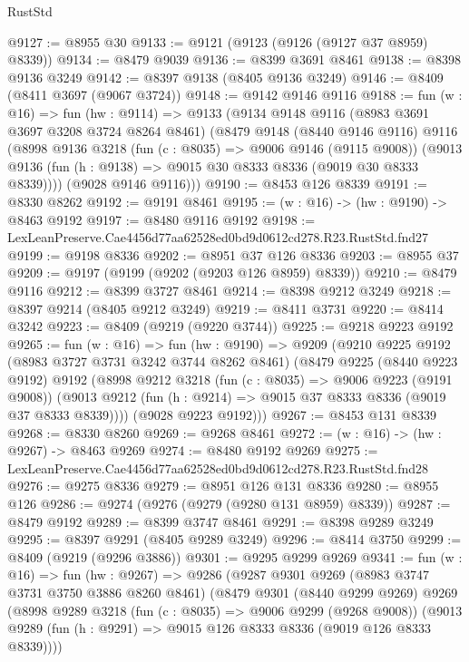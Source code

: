 \begin{lexlean}{RustStd}
\begin{coremodule}
@9127 := @8955 @30
@9133 := @9121 (@9123 (@9126 (@9127 @37 @8959) @8339))
@9134 := @8479 @9039
@9136 := @8399 @3691 @8461
@9138 := @8398 @9136 @3249
@9142 := @8397 @9138 (@8405 @9136 @3249)
@9146 := @8409 (@8411 @3697 (@9067 @3724))
@9148 := @9142 @9146 @9116
@9188 := fun (w : @16) =>
  fun (hw : @9114) =>
  @9133
    (@9134
      @9148
      @9116
      (@8983 @3691 @3697 @3208 @3724 @8264 @8461)
      (@8479
        @9148
        (@8440 @9146 @9116)
        @9116
        (@8998
          @9136
          @3218
          (fun (c : @8035) => @9006 @9146 (@9115 @9008))
          (@9013 @9136 (fun (h : @9138) => @9015 @30 @8333 @8336 (@9019 @30 @8333 @8339))))
        (@9028 @9146 @9116)))
@9190 := @8453 @126 @8339
@9191 := @8330 @8262
@9192 := @9191 @8461
@9195 := (w : @16) -> (hw : @9190) -> @8463 @9192
@9197 := @8480 @9116 @9192
@9198 := LexLeanPreserve.Cae4456d77aa62528ed0bd9d0612cd278.R23.RustStd.fnd27
@9199 := @9198 @8336
@9202 := @8951 @37 @126 @8336
@9203 := @8955 @37
@9209 := @9197 (@9199 (@9202 (@9203 @126 @8959) @8339))
@9210 := @8479 @9116
@9212 := @8399 @3727 @8461
@9214 := @8398 @9212 @3249
@9218 := @8397 @9214 (@8405 @9212 @3249)
@9219 := @8411 @3731
@9220 := @8414 @3242
@9223 := @8409 (@9219 (@9220 @3744))
@9225 := @9218 @9223 @9192
@9265 := fun (w : @16) =>
  fun (hw : @9190) =>
  @9209
    (@9210
      @9225
      @9192
      (@8983 @3727 @3731 @3242 @3744 @8262 @8461)
      (@8479
        @9225
        (@8440 @9223 @9192)
        @9192
        (@8998
          @9212
          @3218
          (fun (c : @8035) => @9006 @9223 (@9191 @9008))
          (@9013 @9212 (fun (h : @9214) => @9015 @37 @8333 @8336 (@9019 @37 @8333 @8339))))
        (@9028 @9223 @9192)))
@9267 := @8453 @131 @8339
@9268 := @8330 @8260
@9269 := @9268 @8461
@9272 := (w : @16) -> (hw : @9267) -> @8463 @9269
@9274 := @8480 @9192 @9269
@9275 := LexLeanPreserve.Cae4456d77aa62528ed0bd9d0612cd278.R23.RustStd.fnd28
@9276 := @9275 @8336
@9279 := @8951 @126 @131 @8336
@9280 := @8955 @126
@9286 := @9274 (@9276 (@9279 (@9280 @131 @8959) @8339))
@9287 := @8479 @9192
@9289 := @8399 @3747 @8461
@9291 := @8398 @9289 @3249
@9295 := @8397 @9291 (@8405 @9289 @3249)
@9296 := @8414 @3750
@9299 := @8409 (@9219 (@9296 @3886))
@9301 := @9295 @9299 @9269
@9341 := fun (w : @16) =>
  fun (hw : @9267) =>
  @9286
    (@9287
      @9301
      @9269
      (@8983 @3747 @3731 @3750 @3886 @8260 @8461)
      (@8479
        @9301
        (@8440 @9299 @9269)
        @9269
        (@8998
          @9289
          @3218
          (fun (c : @8035) => @9006 @9299 (@9268 @9008))
          (@9013 @9289 (fun (h : @9291) => @9015 @126 @8333 @8336 (@9019 @126 @8333 @8339))))

\end{coremodule}
\end{lexlean}
